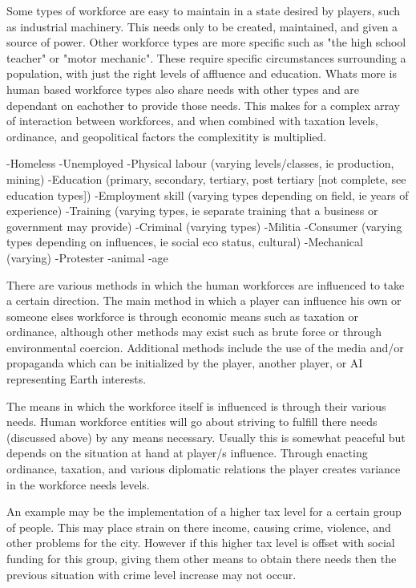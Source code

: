 Some types of workforce are easy to maintain in a state desired by players, such as industrial machinery. This needs only to be created, maintained, and given a source of power. Other workforce types are more specific such as "the high school teacher" or "motor mechanic". These require specific circumstances surrounding a population, with just the right levels of affluence and education. Whats more is human based workforce types also share needs with other types and are dependant on eachother to provide those needs. This makes for a complex array of interaction between workforces, and when combined with taxation levels, ordinance, and geopolitical factors the complexitity is multiplied.


-Homeless
-Unemployed
-Physical labour (varying levels/classes, ie production, mining)
-Education (primary, secondary, tertiary, post tertiary [not complete, see education types])
-Employment skill (varying types depending on field, ie years of experience)
-Training (varying types, ie separate training that a business or government may provide)
-Criminal (varying types)
-Militia
-Consumer (varying types depending on influences, ie social eco status, cultural)
-Mechanical (varying) 
-Protester
-animal
-age







There are various methods in which the human workforces are influenced to take a certain direction. The main method in which a player can influence his own or someone elses workforce is through economic means such as taxation or ordinance, although other methods may exist such as brute force or through environmental coercion. Additional methods include the use of the media and/or propaganda which can be initialized by the player, another player, or AI representing Earth interests.

The means in which the workforce itself is influenced is through their various needs. Human workforce entities will go about striving to fulfill there needs (discussed above) by any means necessary. Usually this is somewhat peaceful but depends on the situation at hand at player/s influence. Through enacting ordinance, taxation, and various diplomatic relations the player creates variance in the workforce needs levels. 

An example may be the implementation of a higher tax level for a certain group of people. This may place strain on there income, causing crime, violence, and other problems for the city. However if this higher tax level is offset with social funding for this group, giving them other means to obtain there needs then the previous situation with crime level increase may not occur. 

